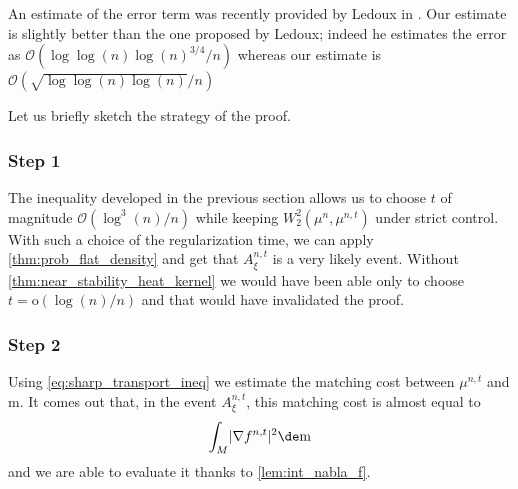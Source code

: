 \documentclass[JEP,XML,SOM,Unicode]{cedram}
\theoremstyle{plain}
\theoremstyle{definition}
\numberwithin{equation}{section}
\newcommand{\bigo}{\ensuremath{\mathcal{O}}}
\newcommand{\smallo}{\ensuremath{\mathrm{o}}}
\newcommand{\m}{\ensuremath{\mathrm m}}
\DeclarePairedDelimiter\abs{\lvert}{\rvert}
\begin{document}
An estimate of the error term was recently provided by Ledoux in
\cite[Eqs.\,(16) \& (17)]{Ledoux18}.
Our estimate is slightly better than the one proposed by Ledoux; indeed he estimates the error as
$\bigo(\log\log(n)\log(n)^{3/4}/n)$ whereas our estimate is $\bigo(\sqrt{\log\log(n)\log(n)}/n)$

Let us briefly sketch the strategy of the proof.

\subsubsection*{Step 1}
The inequality developed in the previous section allows us to choose $t$ of magnitude
$\bigo(\log^3(n)/n)$ while keeping $W^2_2(\mu^n,\mu^{n,t})$ under strict control. With such a choice
of the regularization time, we can apply \cref{thm:prob_flat_density} and get that $A^{n,t}_\xi$ is a very likely event.
Without \cref{thm:near_stability_heat_kernel} we would have been able only to choose
$t=\smallo(\log(n)/n)$ and that would have invalidated the proof.

\subsubsection*{Step 2}
Using \cref{eq:sharp_transport_ineq} we estimate the matching cost between $\mu^{n,t}$
and $\m$. It comes out that, in the event $A^{n,t}_\xi$, this matching cost is almost equal to
\begin{equation*}
\int_M \abs{\nabla f^{n,t}}^2\de\m
\end{equation*}
and we are able to evaluate it thanks to \cref{lem:int_nabla_f}.
\end{document}
